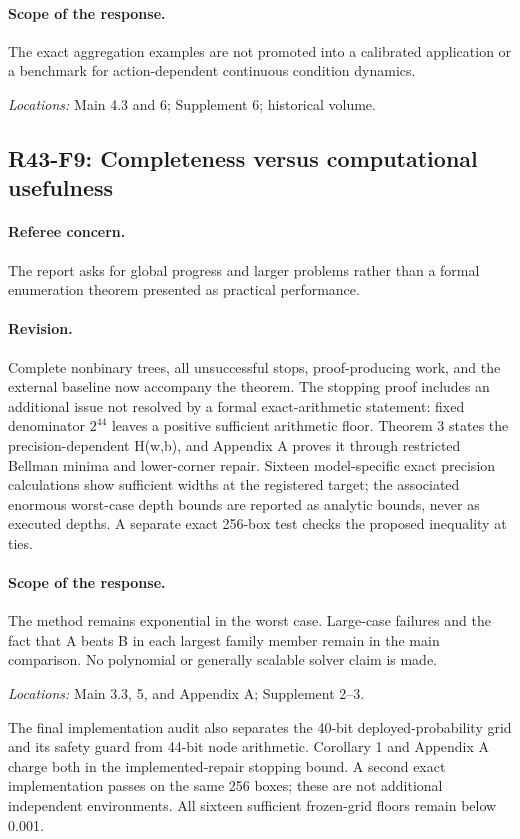 \paragraph*{Scope of the response.} The exact aggregation examples are not promoted into a calibrated application or a benchmark for action-dependent continuous condition dynamics.

\noindent\textit{Locations:} Main 4.3 and 6; Supplement 6; historical volume.

\subsection{R43-F9: Completeness versus computational usefulness}
\paragraph*{Referee concern.} The report asks for global progress and larger problems rather than a formal enumeration theorem presented as practical performance.

\paragraph*{Revision.} Complete nonbinary trees, all unsuccessful stops, proof-producing work, and the external baseline now accompany the theorem. The stopping proof includes an additional issue not resolved by a formal exact-arithmetic statement: fixed denominator $2^{44}$ leaves a positive sufficient arithmetic floor. Theorem 3 states the precision-dependent H(w,b), and Appendix A proves it through restricted Bellman minima and lower-corner repair. Sixteen model-specific exact precision calculations show sufficient widths at the registered target; the associated enormous worst-case depth bounds are reported as analytic bounds, never as executed depths. A separate exact 256-box test checks the proposed inequality at ties.

\paragraph*{Scope of the response.} The method remains exponential in the worst case. Large-case failures and the fact that A beats B in each largest family member remain in the main comparison. No polynomial or generally scalable solver claim is made.

\noindent\textit{Locations:} Main 3.3, 5, and Appendix A; Supplement 2--3.

The final implementation audit also separates the 40-bit deployed-probability grid and its safety guard from 44-bit node arithmetic. Corollary 1 and Appendix A charge both in the implemented-repair stopping bound. A second exact implementation passes on the same 256 boxes; these are not additional independent environments. All sixteen sufficient frozen-grid floors remain below 0.001.

